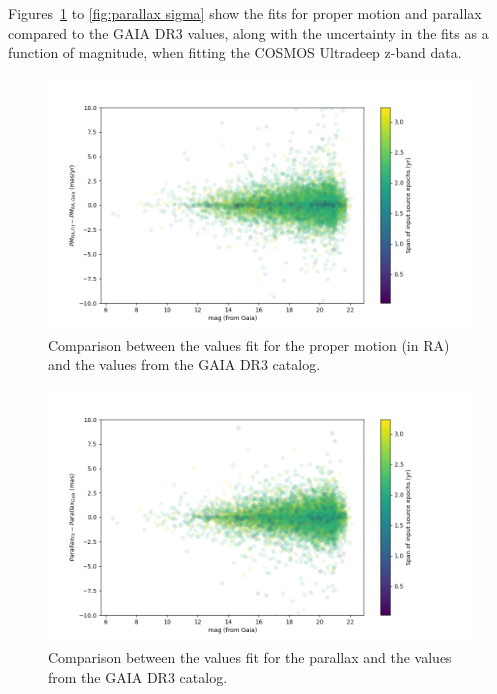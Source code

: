 \documentclass[DM,authoryear,toc]{lsstdoc}
\begin{document}
Figures~\ref{fig:pm gaia comp} to \ref{fig:parallax sigma} show the fits for proper motion and parallax compared to the GAIA DR3 values, along with the uncertainty in the fits as a function of magnitude, when fitting the COSMOS Ultradeep z-band data.
\begin{figure}
\includegraphics[width=\columnwidth]{figures/pm_ra_gaia_comp_9813.png}
\caption{Comparison between the values fit for the proper motion (in RA) and the values from the GAIA DR3 catalog.}
\label{fig:pm gaia comp}
\end{figure}
\begin{figure}
\includegraphics[width=\columnwidth]{figures/parallax_gaia_comp_9813.png}
\caption{Comparison between the values fit for the parallax and the values from the GAIA DR3 catalog.}
\label{fig:parallax gaia comp}
\end{figure}
\end{document}
